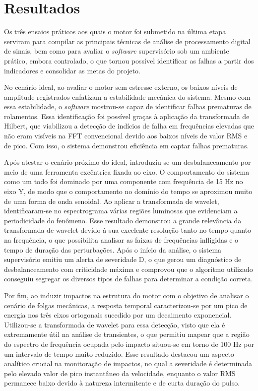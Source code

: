 \documentclass[conference]{IEEEtran}
\begin{document}
\section{Resultados}
Os três ensaios práticos aos quais o motor foi submetido na última etapa serviram para compilar as principais técnicas de análise de processamento digital de sinais, bem como para avaliar o \textit{software} supervisório sob um ambiente prático, embora controlado, o que tornou possível identificar as falhas a partir dos indicadores e consolidar as metas do projeto.

No cenário ideal, ao avaliar o motor sem estresse externo, os baixos níveis de amplitude registrados enfatizam a estabilidade mecânica do sistema. Mesmo com essa estabilidade, o \textit{software} mostrou-se capaz de identificar falhas prematuras de rolamentos. Essa identificação foi possível graças à aplicação da transformada de Hilbert, que viabilizou a detecção de indícios de falha em frequências elevadas que não eram visíveis na FFT convencional devido aos baixos níveis de valor RMS e de pico. Com isso, o sistema demonstrou eficiência em captar falhas prematuras.

Após atestar o cenário próximo do ideal, introduziu-se um desbalanceamento por meio de uma ferramenta excêntrica fixada ao eixo. O comportamento do sistema como um todo foi dominado por uma componente com frequência de 15 Hz no eixo Y, de modo que o comportamento no domínio do tempo se aproximou muito de uma forma de onda senoidal. Ao aplicar a transformada de wavelet, identificaram-se no espectrograma várias regiões luminosas que evidenciam a periodicidade do fenômeno. Esse resultado demonstrou a grande relevância da transformada de wavelet devido à sua excelente resolução tanto no tempo quanto na frequência, o que possibilita analisar as faixas de frequências infligidas e o tempo de duração das perturbações. Após o início da análise, o sistema supervisório emitiu um alerta de severidade D, o que gerou um diagnóstico de desbalanceamento com criticidade máxima e comprovou que o algoritmo utilizado conseguiu segregar os diversos tipos de falhas para determinar a condição correta.

Por fim, ao induzir impactos na estrutura do motor com o objetivo de analisar o cenário de folgas mecânicas, a resposta temporal caracterizou-se por um pico de energia nos três eixos ortogonais sucedido por um decaimento exponencial. Utilizou-se a transformada de wavelet para essa detecção, visto que ela é extremamente útil na análise de transientes, o que permitiu mapear que a região do espectro de frequência ocupada pelo impacto situou-se em torno de 100 Hz por um intervalo de tempo muito reduzido. Esse resultado destacou um aspecto analítico crucial na monitoração de impactos, no qual a severidade é determinada pelo elevado valor de pico instantâneo da velocidade, enquanto o valor RMS permanece baixo devido à natureza intermitente e de curta duração do pulso.
\end{document}
